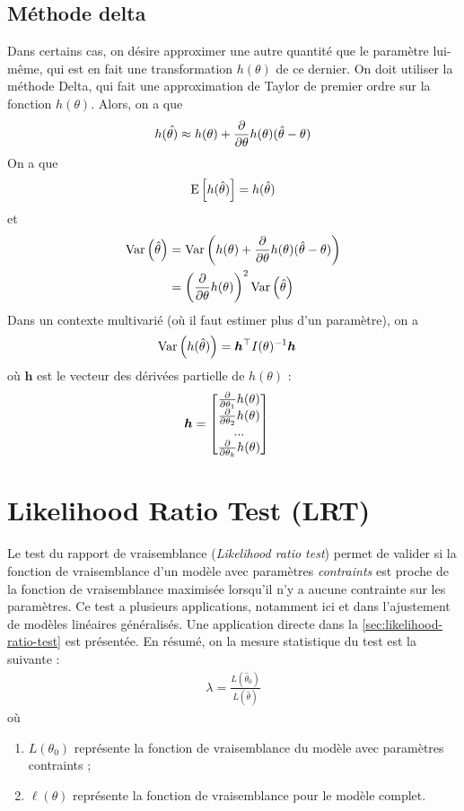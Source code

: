 \documentclass[12pt, french]{report}
\begin{document}
\subsection{Méthode delta}
Dans certains cas, on désire approximer une autre quantité que le paramètre lui-même, qui est en fait une transformation $h(\theta)$ de ce dernier. On doit utiliser la méthode Delta, qui fait une approximation de Taylor de premier ordre sur la fonction $h(\theta)$. Alors, on a que
\begin{align*}
h(\hat{\theta)} \approx h(\theta) + \frac{\partial}{\partial \theta} h(\theta) (\hat{\theta} - \theta)
\end{align*}
On a que
\begin{align*}
\mathrm{E} \left[ h(\hat{\theta}) \right] = h(\hat{\theta})
\end{align*}
et
\begin{align*}
\mathrm{Var} \left( \hat{\theta} \right)	& = \mathrm{Var} \left( h(\theta) +   \frac{\partial}{\partial \theta} h(\theta) (\hat{\theta} - \theta) \right) \\
& = \left( \frac{\partial}{\partial \theta} h(\theta) \right)^2 \mathrm{Var} \left( \hat{\theta} \right) \\
\end{align*}
Dans un contexte multivarié (où il faut estimer plus d'un paramètre), on a
\begin{align*}
\mathrm{Var} \left( h(\hat{\theta}) \right)	& = \bm{h}^{\top} I(\theta)^{-1} \bm{h}
\end{align*}
où $\bm{h}$ est le vecteur des dérivées partielle de $h(\theta)$ : 
\begin{align*}
\bm{h}	& = 
\begin{bmatrix}
\frac{\partial}{\partial \theta_1} h(\theta) \\
\frac{\partial}{\partial \theta_2} h(\theta) \\
... \\
\frac{\partial}{\partial \theta_k} h(\theta) \\
\end{bmatrix}
\end{align*}

\section{Likelihood Ratio Test (LRT)}
Le test du rapport de vraisemblance (\emph{Likelihood ratio test}) permet de valider si la fonction de vraisemblance d'un modèle avec paramètres \emph{contraints} est proche de la fonction de vraisemblance maximisée lorsqu'il n'y a aucune contrainte sur les paramètres. Ce test a plusieurs applications, notamment ici et dans l'ajustement de modèles linéaires généralisés. Une application directe dans la \autoref{sec:likelihood-ratio-test} est présentée. En résumé, on la mesure statistique du test est  la suivante : 
\begin{align*}
\lambda = \frac{L(\hat{\theta}_0)}{L(\hat{\theta})}
\end{align*}
où
\begin{enumerate}[label=\faAngleRight]
\item $L(\theta_0)$ représente la fonction de vraisemblance du modèle avec paramètres contraints ;
\item $\ell(\theta)$ représente la fonction de vraisemblance pour le modèle complet.
\end{enumerate}
\end{document}
